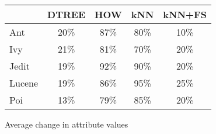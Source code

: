 \begin{figure}[!t]
\centering
{\small
\begin{tabular}{lcccc}
  \hline
  \rowcolor{lightgray}
       & DTREE & HOW   & kNN   & kNN+FS \\\hline
Ant    & 20\% & 87\% & 80\% & 10\%  \\
Ivy    & 21\% & 81\% & 70\% & 20\%  \\
Jedit  & 19\% & 92\% & 90\% & 20\%  \\
Lucene & 19\% & 86\% & 95\% & 25\%  \\
Poi    & 13\% & 79\% & 85\% & 20\%   \\\hline
\end{tabular}}
\noindent
\caption{Average change in attribute values}\label{fig:types}
\end{figure}